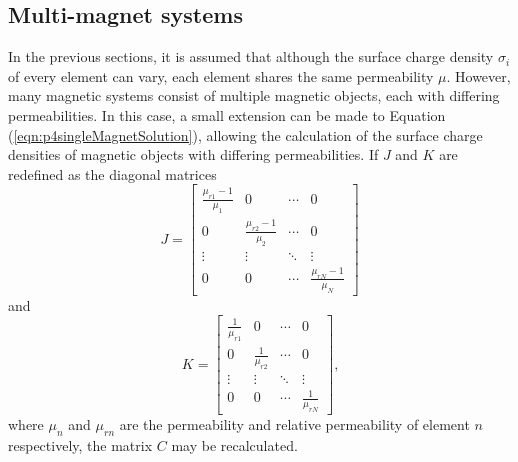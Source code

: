 \subsection{Multi-magnet systems}
In the previous sections, it is assumed that although the surface charge density \(\sigma_i\) of every element can vary, each element shares the same permeability \(\mu\). However, many magnetic systems consist of multiple magnetic objects, each with differing permeabilities. In this case, a small extension can be made to Equation (\ref{eqn:p4singleMagnetSolution}), allowing the calculation of the surface charge densities of magnetic objects with differing permeabilities. If \(J\) and \(K\) are redefined as the diagonal matrices
\begin{equation}\label{eqn:p4JEquation}
	J = \begin{bmatrix} \frac{\mu_{r1} - 1}{\mu_1} & 0 & \cdots & 0 \\
	0 & \frac{\mu_{r2} - 1}{\mu_2} & \cdots & 0 \\
	\vdots & \vdots & \ddots & \vdots \\
	0 & 0 & \cdots & \frac{\mu_{rN} - 1}{\mu_N} \end{bmatrix}
\end{equation}
and
\begin{equation}\label{eqn:p4KEquation}
	K = \begin{bmatrix} \frac{1}{\mu_{r1}} & 0 & \cdots & 0 \\
	0 & \frac{1}{\mu_{r2}} & \cdots & 0 \\
	\vdots & \vdots & \ddots & \vdots \\
	0 & 0 & \cdots & \frac{1}{\mu_{rN}} \end{bmatrix} \text{,}
\end{equation}
where \(\mu_n\) and \(\mu_{rn}\) are the permeability and relative permeability of element \(n\) respectively, the matrix \(C\) may be recalculated.

